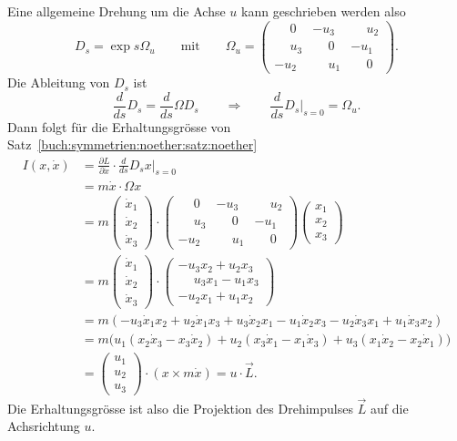 \begin{beispiel}
Eine allgemeine Drehung um die Achse $u$ kann geschrieben werden also
\[
D_s
=
\exp s\Omega_u
\qquad\text{mit}\qquad
\Omega_u
=
\begin{pmatrix}
\phantom{-}0   &         - u_3 & \phantom{-}u_2\\
\phantom{-}u_3 &\phantom{-}0   &          - u_1\\
         - u_2 &\phantom{-}u_1 & \phantom{-}0
\end{pmatrix}.
\]
Die Ableitung von $D_s$ ist
\[
\frac{d}{ds} D_s
=
\frac{d}{ds} \Omega D_s
\qquad\Rightarrow\qquad
\frac{d}{ds}D_s\bigg|_{s=0}
=
\Omega_u.
\]
Dann folgt für die Erhaltungsgrösse
von Satz~\ref{buch:symmetrien:noether:satz:noether} 
\begin{align*}
I(x,\dot{x})
&=
\frac{\partial L}{\partial\dot{x}}
\cdot
\frac{d}{ds}D_sx\bigg|_{s=0}
\\
&=
m\dot{x}
\cdot
\Omega x
\\
&=
m
\begin{pmatrix}
\dot{x}_1\\
\dot{x}_2\\
\dot{x}_3
\end{pmatrix}
\cdot
\begin{pmatrix}
\phantom{-}0   &         - u_3 & \phantom{-}u_2\\
\phantom{-}u_3 &\phantom{-}0   &          - u_1\\
         - u_2 &\phantom{-}u_1 & \phantom{-}0
\end{pmatrix}
\begin{pmatrix}
x_1\\x_2\\x_3
\end{pmatrix}
\\
&=
m
\begin{pmatrix}
\dot{x}_1\\
\dot{x}_2\\
\dot{x}_3
\end{pmatrix}
\cdot
\begin{pmatrix}
          -u_3x_2+u_2x_3\\
\phantom{-}u_3x_1       -u_1x_3\\
          -u_2x_1+u_1x_2    
\end{pmatrix}
\\
&=
m(
- u_3 \dot{x}_1 x_2
+ u_2 \dot{x}_1 x_3
+ u_3 \dot{x}_2 x_1
- u_1 \dot{x}_2 x_3
- u_2 \dot{x}_3 x_1
+ u_1 \dot{x}_3 x_2
)
\\
&=
m\bigl(
u_1(x_2\dot{x}_3 - x_3\dot{x}_2)
+
u_2(x_3\dot{x}_1-x_1\dot{x}_3)
+
u_3(x_1\dot{x}_2-x_2\dot{x}_1)
\bigr)
\\
&=
\begin{pmatrix}u_1\\u_2\\u_3\end{pmatrix}
\cdot
(x\times m\dot{x})
=
u\cdot \vec{L}.
\end{align*}
Die Erhaltungsgrösse ist also die Projektion des Drehimpulses $\vec{L}$
auf die Achsrichtung $u$.
\end{beispiel}

